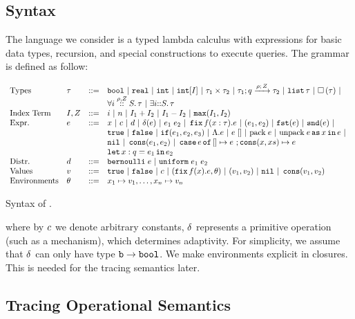 \subsection{Syntax}
The language we consider is a typed lambda calculus with expressions
for basic data types, recursion, and special constructions to execute
queries. The grammar is defined as follow:

\begin{table}
\[\begin{array}{llll}
  \mbox{Types} & \type & ::= & \tbool ~|~  \treal ~|~  \tint ~|~   \tint[I] ~|~ \type_1 \times
  \type_2 ~|~ \tarr{\type_1}{\type_2}{\nnatbiA}{\dmap}{\nnatA} ~|~
                              \tlist{\type} ~|~ \tbox{\type}~|~ \\
& & &                      \tforall{\dmap}{\nnatA}{i} \type  ~|~ \texists{i} \type\\
\mbox{Index Term} & \idx, \nnatA & ::= &     i ~|~ n ~|~ \idx_1 + \idx_2 ~|~  \idx_1
                                 - \idx_2 ~|~ \smax{\idx_1}{\idx_2}\\
\mbox{Expr.} & \expr & ::= & x ~|~ \econst ~|~ \distr ~|~ \eop(\expr) ~|~ \expr_1 \eapp \expr_2 ~|~ \efix f(x:\tau).\expr
 ~|~ (\expr_1, \expr_2) ~|~ \eprojl(\expr) ~|~ \eprojr(\expr) ~| \\
%
& & & \etrue ~|~ \efalse ~|~ \eif(\expr_1, \expr_2, \expr_3) ~|~ \eilam \expr  ~|~  \expr \eapp []  ~|~
                            \epack \expr ~|~ \eunpack \expr \eas x
                            \ein \expr ~|~
\\
& & &  \enil ~|~  \econs (
      \expr_1, \expr_2) ~|~ 
      \ecase \expr \eof\, []\mapsto\expr~;\econs(x,xs)\mapsto\expr\\
& & &  \elet  x:q = \expr_1 \ein \expr_2\\
%
\mbox{Distr.} & \distr & ::= & \bernoulli \eapp \expr ~|~ \uniform \eapp \expr_1 \eapp \expr_2\\      
\mbox{Values} & \valr & ::= & \etrue ~|~ \efalse ~|~ \econst ~|~
(\efix f(x).\expr, \env) ~|~ (\valr_1, \valr_2) 
    ~|~ \enil ~|~ \econs (\valr_1, \valr_2)\\
\mbox{Environments} & \env & ::= & x_1 \mapsto \valr_1, \ldots, x_n \mapsto \valr_n\\
\end{array}\]
\caption{Syntax of \THESYSTEM.}
\label{tab:syntax}
\end{table}
where by $c$ we denote arbitrary constants, $\delta$ represents a primitive operation (such as a
mechanism), which determines adaptivity. For simplicity, we assume
that $\delta$ can only have type $\mathtt{b} \to \mathtt{bool}$. We make
environments explicit in closures. This is needed for the tracing
semantics later.
\subsection{Tracing Operational Semantics}
